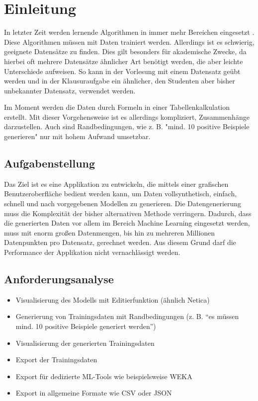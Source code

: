 
\chapter{Einleitung}

In letzter Zeit werden lernende Algorithmen in immer mehr Bereichen eingesetzt \cite{mengesonnentag:2018}. Diese Algorithmen müssen mit Daten trainiert werden. Allerdings ist es schwierig, geeignete Datensätze zu finden. Dies gilt besonders für akademische Zwecke, da hierbei oft mehrere Datensätze ähnlicher Art benötigt werden, die aber leichte Unterschiede aufweisen. So kann in der Vorlesung mit einem Datensatz geübt werden und in der Klausuraufgabe ein ähnlicher, den Studenten aber bisher unbekannter Datensatz, verwendet werden.

Im Moment werden die Daten durch Formeln in einer Tabellenkalkulation erstellt. Mit dieser Vorgehensweise ist es allerdings kompliziert, Zusammenhänge darzustellen. Auch sind Randbedingungen, wie z. B. "mind. 10 positive Beispiele generieren" nur mit hohem Aufwand umsetzbar.

\section{Aufgabenstellung}

Das Ziel ist es eine Applikation zu entwickeln, die mittels einer grafischen Benutzeroberfläche bedient werden kann, um Daten vollsynthetisch, einfach, schnell und nach vorgegebenen Modellen zu generieren. Die Datengenerierung muss die Komplexität der bisher alternativen Methode verringern. Dadurch, dass die generierten Daten vor allem im Bereich Machine Learning eingesetzt werden, muss mit enorm großen Datenmengen, bis hin zu mehreren Millionen Datenpunkten pro Datensatz, gerechnet werden. Aus diesem Grund darf die Performance der Applikation nicht vernachlässigt werden.

\section{Anforderungsanalyse}
\label{sec:anforderungsanalyse}

\begin{itemize}
    \item Visualisierung des Modells mit Editierfunktion (ähnlich Netica)
    \item Generierung von Trainingsdaten mit Randbedingungen (z. B. \enquote{es müssen mind. 10 positive Beispiele generiert werden})
    \item Visualisierung der generierten Trainingsdaten
    \item Export der Trainingsdaten
    \item Export für dedizierte ML-Tools wie beispielsweise WEKA
    \item Export in allgemeine Formate wie CSV oder JSON 
\end{itemize}
